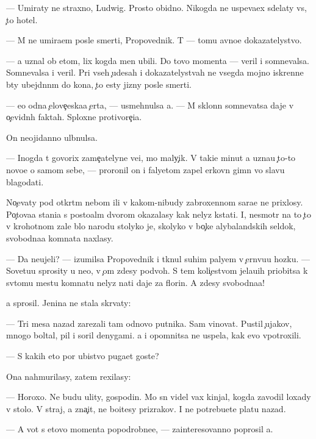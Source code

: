 \documentclass[10pt]{book}
\begin{document}
— Umiraty ne straxno, Ludwig. Prosto obidno. Nikogda ne uspeva{\y}ex sdelaty vs{\e}, {\c}to hotel.

— M{\yi} ne umira{\y}em posle smerti, Propovednik. T{\yi} — tomu {\y}avno{\y}e dokazatelystvo.

— {\Y}a uznal ob etom, lix kogda men{\ia} ubili. Do tovo momenta — veril i somnevalsa. Somnevalsa i veril. Pri vseh {\c}udesah i dokazatelystvah ne vsegda mojno iskrenne b{\yi}ty ubejd{\e}nn{\yi}m do kon{\q}a, {\c}to {\y}esty jizny posle smerti.

— {\Y}e{\x}o odna {\c}elove{\c}eska{\y}a {\c}erta, — usmehnulsa {\y}a. — M{\yi} sklonn{\yi} somnevatsa daje v o{\c}evidn{\yi}h faktah. Sploxn{\yi}{\y}e protivore{\c}i{\y}a.

On neojidanno ul{\yi}bnulsa.

— Inogda t{\yi} govorix zame{\c}atelyn{\yi}{\y}e ve{\x}i, mo{\y} maly{\c}ik. V taki{\y}e minut{\yi} {\y}a uzna{\y}u {\c}to-to novo{\y}e o samom sebe, — proronil on i faly{\q}etom zapel {\q}erkovn{\yi}{\y} gimn vo slavu blagodati.



No{\c}evaty pod otkr{\yi}t{\yi}m nebom ili v kakom-nibudy zabroxennom sara{\y}e ne prixlosy. Po{\c}tova{\y}a stan{\q}i{\y}a s posto{\y}al{\yi}m dvorom okazalasy kak nelyz{\ia} kstati. I, nesmotr{\ia} na to {\c}to v krohotnom zale b{\yi}lo narodu stolyko je, skolyko v bo{\c}ke alybalandskih sel{\e}dok, svobodna{\y}a komnata naxlasy.

— Da neujeli? — izumilsa Propovednik i tknul suhim paly{\q}em v {\c}ern{\ia}vu{\y}u hoz{\ia}{\y}ku. — Sovetu{\y}u sprosity u ne{\y}o, v {\c}om zdesy podvoh. S tem koli{\c}estvom jela{\y}u{\x}ih priob{\x}itsa k sv{\ia}tomu mestu komnatu nelyz{\ia} na{\y}ti daje za florin. A zdesy svobodna{\y}a!

{\Y}a sprosil. Jen{\x}ina ne stala skr{\yi}vaty:

— Tri mes{\ia}{\q}a nazad zarezali tam odnovo putnika. Sam vinovat. Pustil {\c}ujakov, mnogo boltal, pil i soril denygami. {\Y}a i opomnitsa ne uspela, kak {\y}evo v{\yi}potroxili.

— S kakih eto por ubi{\y}stvo puga{\y}et goste{\y}?

Ona nahmurilasy, zatem rexilasy:

— Horoxo. Ne budu {\y}ulity, gospodin. Mo{\y} s{\yi}n videl vax kinjal, kogda zavodil loxady v sto{\y}lo. V{\yi} straj, a zna{\c}it, ne bo{\y}itesy prizrakov. I ne potrebu{\y}ete platu nazad.

— A vot s etovo momenta popodrobne{\y}e, — zainteresovanno poprosil {\y}a.
\end{document}
